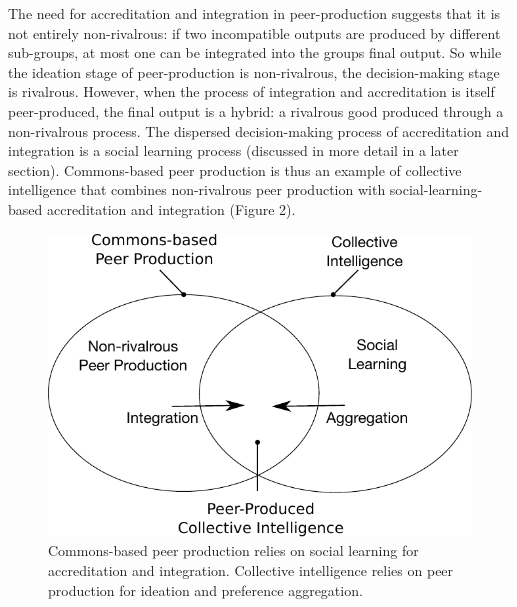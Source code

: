 The need for accreditation and integration in peer-production suggests that it is not entirely non-rivalrous: if two incompatible outputs are produced by different sub-groups, at most one can be integrated into the groups final output. So while the ideation stage of peer-production is non-rivalrous, the decision-making stage is rivalrous. However, when the process of integration and accreditation is itself peer-produced, the final output is a hybrid: a rivalrous good produced through a non-rivalrous process. The dispersed decision-making process of accreditation and integration is a social learning process (discussed in more detail in a later section). Commons-based peer production is thus an example of collective intelligence that combines non-rivalrous peer production with social-learning-based accreditation and integration (Figure 2).

\begin{figure}
\centering
\includegraphics{images/fig-peer-intelligence.pdf}
\caption{
Commons-based peer production relies on social learning for
accreditation and integration. Collective intelligence relies on peer
production for ideation and preference aggregation.\label{fig:peer-intelligence}
}
\end{figure}

